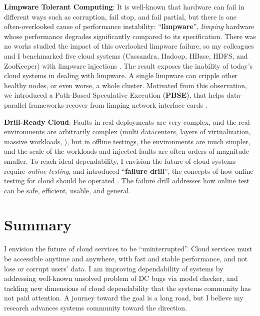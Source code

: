 \documentclass[10pt]{article}
\begin{document}
\noindent
\textbf{Limpware Tolerant Computing}: It is well-known that hardware can fail in
different ways such as corruption, fail stop, and fail partial, but there is one
often-overlooked cause of performance instability:
``\textbf{limpware}'', \textit{limping} hardware whose performance
degrades significantly compared to its specification. There was no works
studied the impact of this overlooked limpware failure, so my colleagues and I
benchmarked five cloud systems (Cassandra, Hadoop, HBase, HDFS, and ZooKeeper)
with limpware injections \cite{Do+13-Limplock}. The result exposes the inability
of today's cloud systems in dealing with limpware. A single limpware can cripple
other healthy nodes, or even worse, a whole cluster. Motivated from this
observation, we introduced a Path-Based Speculative Execution
(\textbf{PBSE}), that helps data-parallel frameworks recover from limping
network interface cards \cite{Suminto+17-PBSE-InPrep}.


\noindent
\textbf{Drill-Ready Cloud}: Faults in real deployments are very complex, and the
real environments are arbitrarily complex (multi datacenters, layers of
virtualization, massive workloads, \etc), but in offline testings, the
environments are much simpler, and the scale of the workloads and injected
faults are often orders of magnitude smaller. To reach ideal dependability, I
envision the future of cloud systems require \textit{online testing}, and
introduced ``\textbf{failure drill}'', the concepts of how online testing for
cloud should be operated \cite{Leesatapornwongsa+14-Drill-fixed}. The failure
drill addresses how online test can be safe, efficient, usable, and general.

\section{Summary}

I envision the future of cloud services to be ``uninterrupted''. Cloud services
must be accessible anytime and anywhere, with fast and stable performance, and
not lose or corrupt users' data.
%
I am improving dependability of systems by addressing well-known unsolved
problem of DC bugs via model checker, and tackling new dimensions of cloud
dependability that the systems community has not paid attention. A journey
toward the goal is a long road, but I believe my research advances systems
community toward the direction. 


\end{document}
